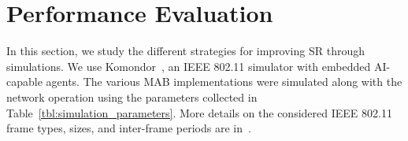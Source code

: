 \section{Performance Evaluation}
\label{sec:performance_evaluation}

In this section, we study the different strategies for improving SR through simulations. We use Komondor~\cite{barrachina2019komondor}, an IEEE 802.11 simulator with embedded AI-capable agents. The various MAB implementations were simulated along with the network operation using the parameters collected in Table~\ref{tbl:simulation_parameters}. More details on the considered IEEE 802.11 frame types, sizes, and inter-frame periods are in~\cite[Table~B.6]{wilhelmi2021spatial}.

\begin{table}[ht!]
\centering
\caption{Simulation parameters.}
\label{tbl:simulation_parameters}
\end{table}
